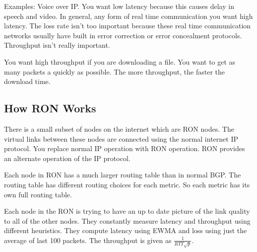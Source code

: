 \documentclass[psamsfonts]{amsart}
\begin{document}
Examples: Voice over IP. You want low latency because this causes delay in speech and video. In general, any form of real time communication you want high latency. The loss rate isn't too important because these real time communication networks usually have built in error correction or error concealment protocols. Throughput isn't really important.

You want high throughput if you are downloading a file. You want to get as many packets a quickly as possible. The more throughput, the faster the download time.

\subsection{How RON Works}

There is a small subset of nodes on the internet which are RON nodes. The virtual links between these nodes are connected using the normal internet IP protocol. You replace normal IP operation with RON operation. RON provides an alternate operation of the IP protocol.

Each node in RON has a much larger routing table than in normal BGP. The routing table has different routing choices for each metric. So each metric has its own full routing table.

Each node in the RON is trying to have an up to date picture of the link quality to all of the other nodes. They constantly measure latency and throughput using different heuristics. They compute latency using EWMA and loss using just the average of last 100 packets. The throughput is given as $\frac{1}{RTT \sqrt{p}}$.
\end{document}
